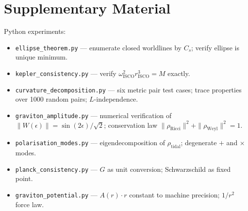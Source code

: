 \documentclass[11pt]{article}
\begin{document}
\section*{Supplementary Material}

Python experiments:
\begin{itemize}
  \item \texttt{ellipse\_theorem.py} --- enumerate closed worldlines
        by $C_s$; verify ellipse is unique minimum.
  \item \texttt{kepler\_consistency.py} --- verify
        $\omega^2_{\mathrm{ISCO}} r^3_{\mathrm{ISCO}} = M$ exactly.
  \item \texttt{curvature\_decomposition.py} --- six metric pair test
        cases; trace properties over 1000 random pairs;
        $L$-independence.
  \item \texttt{graviton\_amplitude.py} --- numerical verification of
        $\|W(\epsilon)\| = \sin(2\epsilon)/\sqrt{2}$; conservation law
        $\|\rho_{\mathrm{Ricci}}\|^2 + \|\rho_{\mathrm{Weyl}}\|^2 = 1$.
  \item \texttt{polarisation\_modes.py} --- eigendecomposition of
        $\rho_{\mathrm{tidal}}$; degenerate $+$ and $\times$ modes.
  \item \texttt{planck\_consistency.py} --- $G$ as unit conversion;
        Schwarzschild as fixed point.
  \item \texttt{graviton\_potential.py} --- $A(r)\cdot r$ constant to
        machine precision; $1/r^2$ force law.
\end{itemize}



\printbibliography
\end{document}

